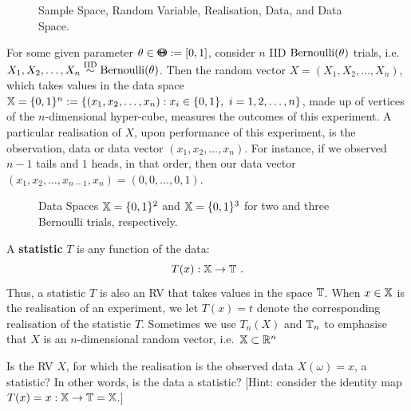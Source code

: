 \begin{figure}[htpb]
\caption{Sample Space, Random Variable, Realisation, Data, and Data Space.\label{F:Data}}
\vspace{2.5in}
\end{figure}

\begin{example}
For some given parameter $\theta \in {\Theta}\mspace{-11 mu}{\Theta} := [0,1]$, consider $n$ IID $\mbox{{\rm Bernoulli}}(\theta)$ trials, i.e.~$X_1,X_2,\ldots,X_n \overset{{\rm IID}}{\sim} \mbox{{\rm Bernoulli}}(\theta)$.  Then the random vector $X=(X_1,X_2,\ldots,X_n)$, which takes values in the data space $\mathbb{X} = \{0,1\}^n := \{ (x_1,x_2,\ldots,x_n) : x_i \in \{0,1\}, \ i=1,2,\ldots,n \}$, made up of vertices of the $n$-dimensional hyper-cube, measures the outcomes of this experiment.  A particular realisation of $X$, upon performance of this experiment, is the observation, data or data vector $(x_1,x_2,\ldots,x_n)$.  For instance, if we observed $n-1$ tails and $1$ heads, in that order, then our data vector $(x_1,x_2,\ldots,x_{n-1},x_n) = (0,0,\ldots,0,1)$.
\end{example}

\begin{figure}
\caption{Data Spaces $\mathbb{X}=\{0,1\}^2$ and $\mathbb{X}=\{0,1\}^3$ for two and three Bernoulli trials, respectively.\label{F:BernoulliDataSpace2and3}}
\centering   {}
\end{figure}

\begin{definition}[Statistic]\label{D:Statistic}
A {\bf statistic} $T$ is any 
function of the data:
\[
T(x) : \mathbb{X} \to \mathbb{T} \ .
\]
Thus, a statistic $T$ is also an RV that takes values in the space $\mathbb{T}$.  When $x \in \mathbb{X}$ is the realisation of an experiment, we let $T(x)=t$ denote the corresponding realisation of the statistic $T$. Sometimes we use $T_n(X)$ and $\mathbb{T}_n$ to emphasise that $X$ is an $n$-dimensional random vector, i.e.~$\mathbb{X} \subset \mathbb{R}^n$ 
\end{definition}

\begin{classwork}
Is the RV $X$, for which the realisation is the observed data $X(\omega)=x$, a statistic?  In other words, is the data a statistic? [Hint: consider the identity map $T(x)=x: \mathbb{X} \to \mathbb{T}=\mathbb{X}$.]
\end{classwork}

